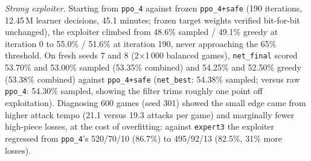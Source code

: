 \emph{Strong exploiter.} Starting from \texttt{ppo\_4} against frozen \texttt{ppo\_4+safe} (190
iterations, 12.45\,M learner decisions, 45.1 minutes; frozen target weights verified bit-for-bit
unchanged), the exploiter climbed from 48.6\% sampled / 49.1\% greedy at iteration 0 to 55.0\% /
51.6\% at iteration 190, never approaching the 65\% threshold. On fresh seeds 7 and 8
(2$\times$1\,000 balanced games), \texttt{net\_final} scored 53.70\% and 53.00\% sampled (53.35\%
combined) and 54.25\% and 52.50\% greedy (53.38\% combined) against \texttt{ppo\_4+safe}
(\texttt{net\_best}: 54.38\% sampled; versus raw \texttt{ppo\_4}: 54.30\% sampled, showing the
filter trims roughly one point off exploitation). Diagnosing 600 games (seed 301) showed the small
edge came from higher attack tempo (21.1 versus 19.3 attacks per game) and marginally fewer high-piece
losses, at the cost of overfitting: against \texttt{expert3} the exploiter regressed from
\texttt{ppo\_4}'s 520/70/10 (86.7\%) to 495/92/13 (82.5\%, 31\% more losses).

